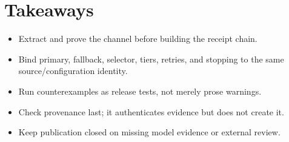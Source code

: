 \documentclass[11pt]{article}
\begin{document}
\section{Takeaways}
\begin{itemize}[leftmargin=*]
\item Extract and prove the channel before building the receipt chain.
\item Bind primary, fallback, selector, tiers, retries, and stopping to the same source/configuration identity.
\item Run counterexamples as release tests, not merely prose warnings.
\item Check provenance last; it authenticates evidence but does not create it.
\item Keep publication closed on missing model evidence or external review.
\end{itemize}
\end{document}
